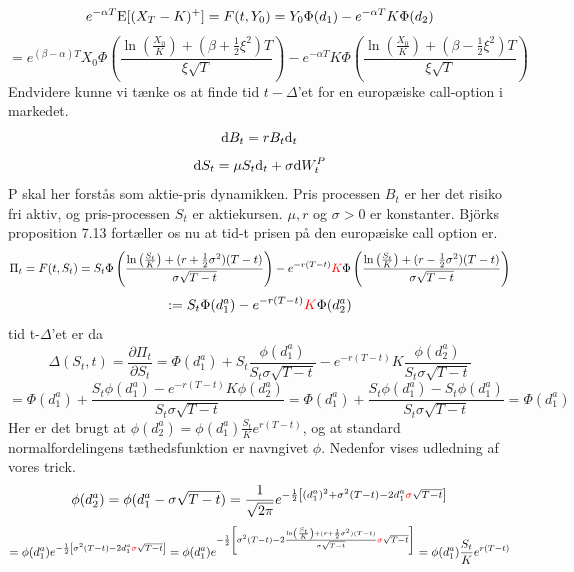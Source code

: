 \documentclass{article}
\theoremstyle{definition}
\theoremstyle{remark}
\begin{document}
$$e^{-\alpha T}\text E[(X_T-K)^+]=\color{black}F(t,Y_0)=Y_0\Phi(d_1)-e^{-\alpha T}K\Phi(d_2)$$\color{black}
$$=e^{(\beta-\alpha)T}X_0\Phi\left(\frac{\ln\left(\frac{X_0}{K}\right)+(\beta+\frac12\xi^2)T}{\xi\sqrt T}\right)-e^{-\alpha T}K\Phi\left(\frac{\ln\left(\frac{X_0}{K}\right)+(\beta-\frac12\xi^2)T}{\xi\sqrt T}\right)$$
Endvidere kunne vi tænke os at finde tid $t-\Delta$'et for en europæiske call-option i markedet.
$$\text dB_t = rB_t\text d_t$$
$$\text d S_t = \mu S_t\text d_t +\sigma \text dW_t^P$$
P skal her forstås som aktie-pris dynamikken. Pris processen $B_t$ er her det risiko fri aktiv, og pris-processen $S_t$ er aktiekursen. $\mu,r$ og $\sigma>0$ er konstanter. Björks proposition 7.13 \cite{Bjork2020} fortæller os nu at tid-t prisen på den europæiske call option er.
$$\Pi_t=F(t,S_t)=S_t\Phi\left(\frac{\ln\left(\frac{S_t}{K}\right)+(r+\frac12\sigma^2)(T-t)}{\sigma\sqrt{T-t}}\right)-e^{-r(T-t)}\color{red}K\color{black}\Phi\left(\frac{\ln\left(\frac{S_t}{K}\right)+(r-\frac12\sigma^2)(T-t)}{\sigma\sqrt{T-t}}\right)$$
$$:= S_t\Phi(d_1^a)-e^{-r(T-t)}\color{red}K\color{black}\Phi(d_2^a)$$
tid t-$\Delta$'et er da
$$\Delta(S_t,t) = \frac{\partial \Pi_t}{\partial S_t}=\Phi(d_1^a)+S_t\frac{\phi(d_1^a)}{S_t\sigma\sqrt{T-t}}-e^{-r(T-t)}K\frac{\phi(d_2^a)}{S_t\sigma\sqrt{T-t}}$$
$$=\Phi(d_1^a)+\frac{S_t\phi(d_1^a)-e^{-r(T-t)}K\phi(d_2^a)}{S_t\sigma\sqrt{T-t}}=\Phi(d_1^a)+\frac{S_t\phi(d_1^a)-S_t\phi(d_1^a)}{S_t\sigma\sqrt{T-t}}=\Phi(d_1^a)$$
Her er det brugt at $\phi(d_2^a)=\phi(d_1^a)\frac{S_t}{K}e^{r(T-t)}$, og at standard normalfordelingens tæthedsfunktion er navngivet $\phi$. Nedenfor vises udledning af vores trick.
$$\phi(d_2^a)=\phi(d_1^a-\sigma\sqrt{T-t})=\frac{1}{\sqrt{2\pi}}e^{-\frac12\left[(d_1^a)^2+\sigma^2(T-t)-2d_1^a\color{red}\sigma\color{black}\sqrt{T-t}\right]}$$
$$=\phi(d_1^a)e^{-\frac12\left[\sigma^2(T-t)-2d_1^a\color{red}\sigma\color{black}\sqrt{T-t}\right]}=\phi(d_1^a)e^{-\frac12\left[\sigma^2(T-t)-2\frac{\ln\left(\frac{S_t}{K}\right)+(r+\frac12\sigma^2)(T-t)}{\sigma\sqrt{T-t}}\color{red}\sigma\color{black}\sqrt{T-t}\right]}=\phi(d_1^a)\frac{S_t}{K}e^{r(T-t)}$$
\end{document}
